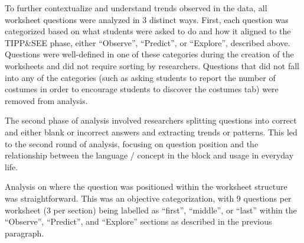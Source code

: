 \documentclass[sigconf,manuscript,review,anonymous]{acmart} %
\def\ts{TIPP\&SEE}
\begin{document}
To further contextualize and understand trends observed in the data, all worksheet questions were analyzed in 3 distinct ways. First, each question was categorized based on what students were asked to do and how it aligned to the \ts{} phase, either ``Observe'', ``Predict'', or ``Explore'', described above. %
Questions were well-defined in one of these categories during the creation of the worksheets and did not require sorting by researchers. Questions that did not fall into any of the categories (such as asking students to report the number of costumes in order to encourage students to discover the costumes tab) were removed from analysis.

The second phase of analysis involved researchers splitting questions into correct and either blank or incorrect answers and extracting trends or patterns. This led to the second round of analysis, focusing on question position and the relationship between the language / concept in the block and usage in everyday life.

Analysis on where the question was positioned within the worksheet structure was straightforward. This was an objective categorization, with 9 questions per worksheet (3 per section) being labelled as ``first'', ``middle'', or ``last'' within the ``Observe'', ``Predict'', and ``Explore'' sections as described in the previous paragraph. 
\end{document}
